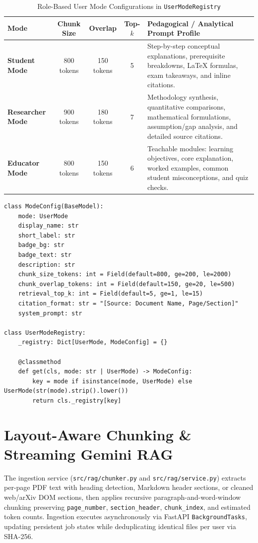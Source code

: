 \documentclass[12pt,a4paper,oneside]{report}
\begin{document}
\begin{table}[H]
    \centering
    \caption{Role-Based User Mode Configurations in \texttt{UserModeRegistry}}
    \label{tab:modes}
    \footnotesize
    \begin{tabularx}{\textwidth}{>{\bfseries}lcccX}
        \toprule
        Mode & Chunk Size & Overlap & Top-$k$ & Pedagogical / Analytical Prompt Profile \\
        \midrule
        Student Mode & 800 tokens & 150 tokens & 5 & Step-by-step conceptual explanations, prerequisite breakdowns, LaTeX formulas, exam takeaways, and inline citations. \\
        Researcher Mode & 900 tokens & 180 tokens & 7 & Methodology synthesis, quantitative comparisons, mathematical formulations, assumption/gap analysis, and detailed source citations. \\
        Educator Mode & 800 tokens & 150 tokens & 6 & Teachable modules: learning objectives, core explanation, worked examples, common student misconceptions, and quiz checks. \\
        \bottomrule
    \end{tabularx}
\end{table}

\begin{lstlisting}[caption={Declarative User Mode Registry Pattern (\texttt{src/auth/modes.py})}, label={lst:mode_registry}]
class ModeConfig(BaseModel):
    mode: UserMode
    display_name: str
    short_label: str
    badge_bg: str
    badge_text: str
    description: str
    chunk_size_tokens: int = Field(default=800, ge=200, le=2000)
    chunk_overlap_tokens: int = Field(default=150, ge=20, le=500)
    retrieval_top_k: int = Field(default=5, ge=1, le=15)
    citation_format: str = "[Source: Document Name, Page/Section]"
    system_prompt: str

class UserModeRegistry:
    _registry: Dict[UserMode, ModeConfig] = {}

    @classmethod
    def get(cls, mode: str | UserMode) -> ModeConfig:
        key = mode if isinstance(mode, UserMode) else UserMode(str(mode).strip().lower())
        return cls._registry[key]
\end{lstlisting}

\section{Layout-Aware Chunking \& Streaming Gemini RAG}
The ingestion service (\texttt{src/rag/chunker.py} and \texttt{src/rag/service.py}) extracts per-page PDF text with heading detection, Markdown header sections, or cleaned web/arXiv DOM sections, then applies recursive paragraph-and-word-window chunking preserving \texttt{page\_number}, \texttt{section\_header}, \texttt{chunk\_index}, and estimated token counts. Ingestion executes asynchronously via FastAPI \texttt{BackgroundTasks}, updating persistent job states while deduplicating identical files per user via SHA-256.
\end{document}
